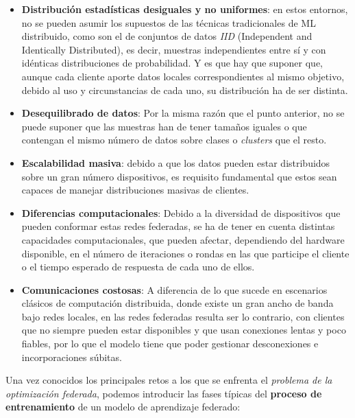 \documentclass[00-Trabajo_Final.tex]{subfiles}
\begin{document}
\begin{itemize}[noitemsep]
    \item \textbf{Distribución estadísticas desiguales y no uniformes}: en estos entornos, no se pueden asumir los supuestos de las técnicas tradicionales de ML distribuido, como son el de conjuntos de datos \textit{IID} (Independent and Identically Distributed), es decir, muestras independientes entre sí y con idénticas distribuciones de probabilidad. Y es que hay que suponer que, aunque cada cliente aporte datos locales correspondientes al mismo objetivo, debido al uso y circunstancias de cada uno, su distribución ha de ser distinta.
    \item \textbf{Desequilibrado de datos}: Por la misma razón que el punto anterior, no se puede suponer que las muestras han de tener tamaños iguales o que contengan el mismo número de datos sobre clases o \textit{clusters} que el resto.
    \item \textbf{Escalabilidad masiva}: debido a que los datos pueden estar distribuidos sobre un gran número dispositivos, es requisito fundamental que estos sean capaces de manejar distribuciones masivas de clientes.
    \item \textbf{Diferencias computacionales}: Debido a la diversidad de dispositivos que pueden conformar estas redes federadas, se ha de tener en cuenta distintas capacidades computacionales, que pueden afectar, dependiendo del hardware disponible, en el número de iteraciones o rondas en las que participe el cliente o el tiempo esperado de respuesta de cada uno de ellos.
    \item \textbf{Comunicaciones costosas}: A diferencia de lo que sucede en escenarios clásicos de computación distribuida, donde existe un gran ancho de banda bajo redes locales, en las redes federadas resulta ser lo contrario, con clientes que no siempre pueden estar disponibles y que usan conexiones lentas y poco fiables, por lo que el modelo tiene que poder gestionar desconexiones e incorporaciones súbitas.
\end{itemize}

Una vez conocidos los principales retos a los que se enfrenta el \textit{problema de la optimización federada}, podemos introducir las fases típicas del \textbf{proceso de entrenamiento} de un modelo de aprendizaje federado:
\end{document}

